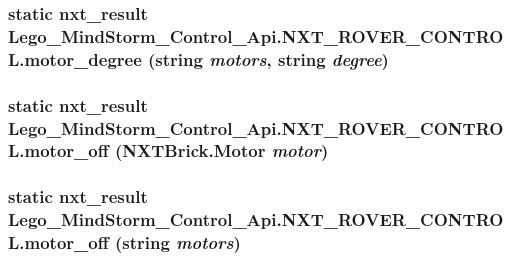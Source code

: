 \hypertarget{class_lego___mind_storm___control___api_1_1_n_x_t___r_o_v_e_r___c_o_n_t_r_o_l_5bf618c31f68327d09a1453dcbdbcf7e}{
\subsubsection[{motor\_\-degree}]{\setlength{\rightskip}{0pt plus 5cm}static {\bf nxt\_\-result} Lego\_\-MindStorm\_\-Control\_\-Api.NXT\_\-ROVER\_\-CONTROL.motor\_\-degree (string {\em motors}, \/  string {\em degree})}}
\label{class_lego___mind_storm___control___api_1_1_n_x_t___r_o_v_e_r___c_o_n_t_r_o_l_5bf618c31f68327d09a1453dcbdbcf7e}


\hypertarget{class_lego___mind_storm___control___api_1_1_n_x_t___r_o_v_e_r___c_o_n_t_r_o_l_334b0c866e932f85ebc8f9c8b3a6671b}{
\subsubsection[{motor\_\-off}]{\setlength{\rightskip}{0pt plus 5cm}static {\bf nxt\_\-result} Lego\_\-MindStorm\_\-Control\_\-Api.NXT\_\-ROVER\_\-CONTROL.motor\_\-off (NXTBrick.Motor {\em motor})}}
\label{class_lego___mind_storm___control___api_1_1_n_x_t___r_o_v_e_r___c_o_n_t_r_o_l_334b0c866e932f85ebc8f9c8b3a6671b}


\hypertarget{class_lego___mind_storm___control___api_1_1_n_x_t___r_o_v_e_r___c_o_n_t_r_o_l_7ead07361e1aadcefbb98694830446a2}{
\subsubsection[{motor\_\-off}]{\setlength{\rightskip}{0pt plus 5cm}static {\bf nxt\_\-result} Lego\_\-MindStorm\_\-Control\_\-Api.NXT\_\-ROVER\_\-CONTROL.motor\_\-off (string {\em motors})}}
\label{class_lego___mind_storm___control___api_1_1_n_x_t___r_o_v_e_r___c_o_n_t_r_o_l_7ead07361e1aadcefbb98694830446a2}


